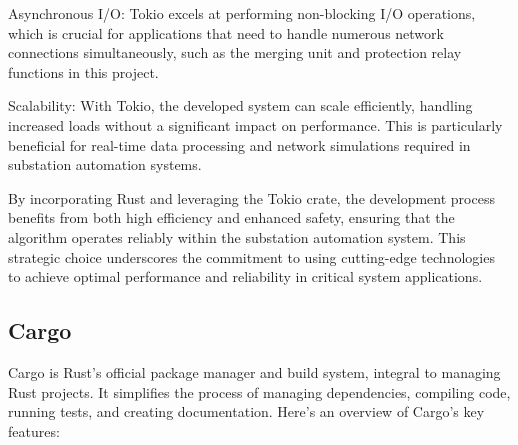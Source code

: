 Asynchronous I/O: Tokio excels at performing non-blocking I/O operations, which is crucial for applications that need to handle numerous network connections simultaneously, such as the merging unit and protection relay functions in this project.

Scalability: With Tokio, the developed system can scale efficiently, handling increased loads without a significant impact on performance. This is particularly beneficial for real-time data processing and network simulations required in substation automation systems.

By incorporating Rust and leveraging the Tokio crate, the development process benefits from both high efficiency and enhanced safety, ensuring that the algorithm operates reliably within the substation automation system. This strategic choice underscores the commitment to using cutting-edge technologies to achieve optimal performance and reliability in critical system applications.

\subsection{Cargo}

Cargo is Rust's official package manager and build system, integral to managing Rust projects. It simplifies the process of managing dependencies, compiling code, running tests, and creating documentation. Here's an overview of Cargo's key features:

